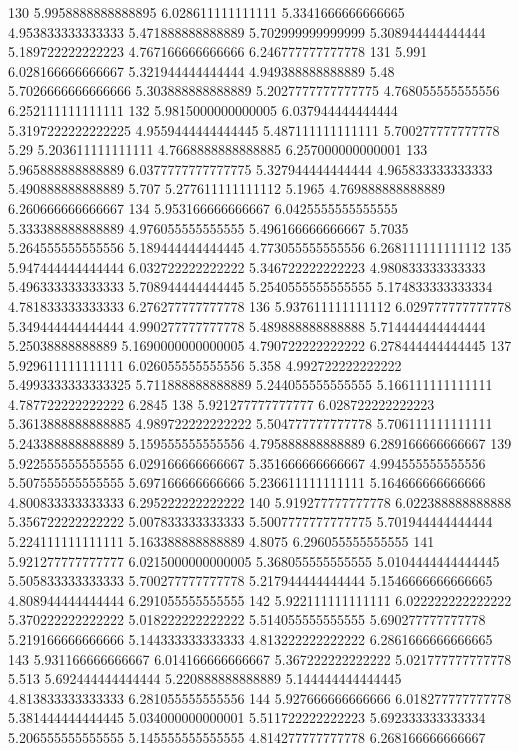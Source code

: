 130 5.9958888888888895 6.028611111111111 5.3341666666666665 4.953833333333333 5.471888888888889 5.702999999999999 5.308944444444444 5.189722222222223 4.767166666666666 6.246777777777778
131 5.991 6.028166666666667 5.321944444444444 4.949388888888889 5.48 5.7026666666666666 5.303888888888889 5.2027777777777775 4.768055555555556 6.252111111111111
132 5.9815000000000005 6.037944444444444 5.3197222222222225 4.9559444444444445 5.487111111111111 5.700277777777778 5.29 5.203611111111111 4.7668888888888885 6.257000000000001
133 5.965888888888889 6.0377777777777775 5.327944444444444 4.965833333333333 5.490888888888889 5.707 5.277611111111112 5.1965 4.769888888888889 6.260666666666667
134 5.953166666666667 6.0425555555555555 5.333388888888889 4.976055555555555 5.496166666666667 5.7035 5.264555555555556 5.189444444444445 4.773055555555556 6.268111111111112
135 5.947444444444444 6.032722222222222 5.346722222222223 4.980833333333333 5.496333333333333 5.708944444444445 5.2540555555555555 5.174833333333334 4.781833333333333 6.276277777777778
136 5.937611111111112 6.029777777777778 5.349444444444444 4.990277777777778 5.489888888888888 5.714444444444444 5.25038888888889 5.1690000000000005 4.790722222222222 6.278444444444445
137 5.929611111111111 6.026055555555556 5.358 4.992722222222222 5.4993333333333325 5.711888888888889 5.244055555555555 5.166111111111111 4.787722222222222 6.2845
138 5.921277777777777 6.028722222222223 5.3613888888888885 4.989722222222222 5.504777777777778 5.706111111111111 5.243388888888889 5.159555555555556 4.795888888888889 6.289166666666667
139 5.922555555555555 6.029166666666667 5.351666666666667 4.994555555555556 5.507555555555555 5.697166666666666 5.236611111111111 5.164666666666666 4.800833333333333 6.295222222222222
140 5.919277777777778 6.022388888888888 5.356722222222222 5.007833333333333 5.5007777777777775 5.701944444444444 5.224111111111111 5.163388888888889 4.8075 6.296055555555555
141 5.921277777777777 6.0215000000000005 5.368055555555555 5.0104444444444445 5.505833333333333 5.700277777777778 5.217944444444444 5.1546666666666665 4.808944444444444 6.291055555555555
142 5.922111111111111 6.022222222222222 5.370222222222222 5.018222222222222 5.514055555555555 5.690277777777778 5.219166666666666 5.144333333333333 4.813222222222222 6.2861666666666665
143 5.931166666666667 6.014166666666667 5.367222222222222 5.021777777777778 5.513 5.692444444444444 5.220888888888889 5.144444444444445 4.813833333333333 6.281055555555556
144 5.927666666666666 6.018277777777778 5.381444444444445 5.034000000000001 5.511722222222223 5.692333333333334 5.206555555555555 5.145555555555555 4.814277777777778 6.268166666666667
